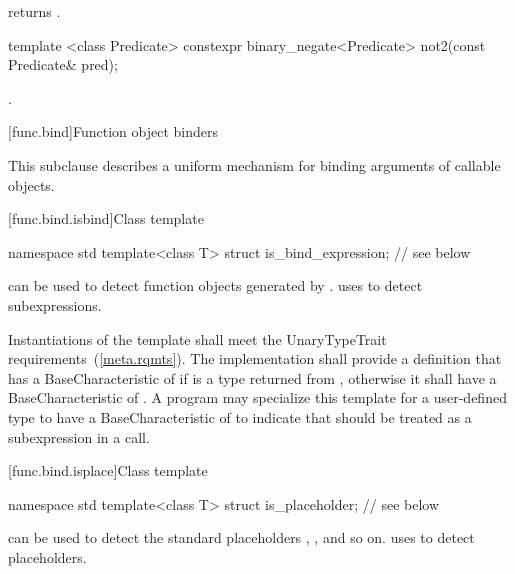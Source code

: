 \begin{itemdescr}
\pnum
{} returns .
\end{itemdescr}

%
\begin{itemdecl}
template <class Predicate>
  constexpr binary_negate<Predicate> not2(const Predicate& pred);
\end{itemdecl}

\begin{itemdescr}
\pnum
\returns
{}.
\end{itemdescr}

[func.bind]{Function object binders}%

\pnum
This subclause describes a uniform mechanism for binding
arguments of callable objects.

[func.bind.isbind]{Class template }

%
\begin{codeblock}
namespace std {
  template<class T> struct is_bind_expression; // see below
}
\end{codeblock}

\pnum
{} can be used to detect function objects
generated by . 
uses  to detect subexpressions.

\pnum
Instantiations of the  template shall meet
the UnaryTypeTrait requirements~(\ref{meta.rqmts}). The implementation
shall provide a definition that has a BaseCharacteristic of
 if  is a type returned from ,
otherwise it shall have a BaseCharacteristic of .
A program may specialize this template for a user-defined type 
to have a BaseCharacteristic of  to indicate that
 should be treated as a subexpression in a  call.

[func.bind.isplace]{Class template }

%
\begin{codeblock}
namespace std {
  template<class T> struct is_placeholder; // see below
}
\end{codeblock}

\pnum
{} can be used to detect the standard placeholders
, , and so on.  uses
 to detect placeholders.

